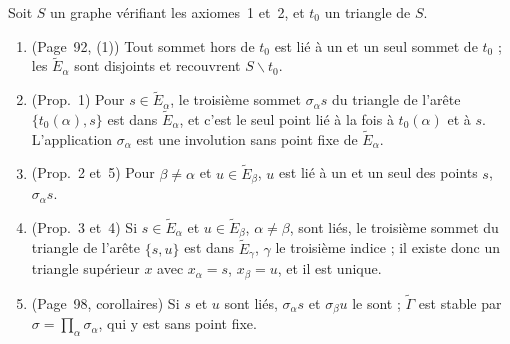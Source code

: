 \begin{enonce}
Soit $S$ un graphe vérifiant les axiomes~1 et~2, et $t_0$ un triangle de $S$.
\begin{enumerate}
\item (Page~92, (1)) Tout sommet hors de $t_0$ est lié à un et un seul sommet de $t_0$ ; les $\widetilde E_\alpha$ sont disjoints et recouvrent $S \smallsetminus t_0$.
\item (Prop.~1) Pour $s \in \widetilde E_\alpha$, le troisième sommet $\sigma_\alpha s$ du triangle de l'arête $\{t_0(\alpha), s\}$ est dans $\widetilde E_\alpha$, et c'est le seul point lié à la fois à $t_0(\alpha)$ et à $s$. L'application $\sigma_\alpha$ est une involution sans point fixe de $\widetilde E_\alpha$.
\item (Prop.~2 et~5) Pour $\beta \neq \alpha$ et $u \in \widetilde E_\beta$, $u$ est lié à un et un seul des points $s$, $\sigma_\alpha s$.
\item (Prop.~3 et~4) Si $s \in \widetilde E_\alpha$ et $u \in \widetilde E_\beta$, $\alpha \neq \beta$, sont liés, le troisième sommet du triangle de l'arête $\{s, u\}$ est dans $\widetilde E_\gamma$, $\gamma$ le troisième indice ; il existe donc un triangle supérieur $x$ avec $x_\alpha = s$, $x_\beta = u$, et il est unique.
\item (Page~98, corollaires) Si $s$ et $u$ sont liés, $\sigma_\alpha s$ et $\sigma_\beta u$ le sont ; $\widetilde\Gamma$ est stable par $\sigma = \prod_\alpha \sigma_\alpha$, qui y est sans point fixe.
\end{enumerate}
\end{enonce}

